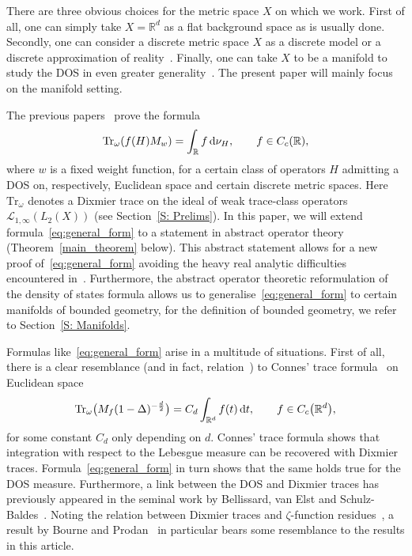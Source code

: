 \documentclass[pdftex]{sigma}
\numberwithin{equation}{section}
\begin{document}
There are three obvious choices for the metric space $X$ on which we work. First of all, one can simply take $X = \mathbb{R}^d$ as a flat background space as is usually done. Secondly, one can consider a discrete metric space $X$ as a discrete model or a discrete approximation of reality~\cite{AizenmanWarzel2015, AlexanderOrbach1982, BourgainKlein2013, CarmonaLacroix1990, ChayesChayes1986, Hof1993, KirschMuller2006, PasturFigotin1992, Veselic2005, Wegner1981}. Finally, one can take $X$ to be a manifold to study the DOS in even greater generality~\cite{AdachiSunada1993, LenzPeyerimhoff2008, LenzPeyerimhoff2004, PeyerimhoffVeselic2002, Veselic2008}. The present paper will mainly focus on the manifold setting.

The previous papers~\cite{AHMSZ,AMSZ} prove the formula
\begin{equation}
\label{eq:general_form}
\mathrm{Tr}_\omega(f(H) M_w) = \int_{\mathbb{R}} f \, {\rm d}\nu_H, \qquad f\in C_c(\mathbb{R}),
\end{equation}
where $w$ is a fixed weight function, for a certain class of operators $H$ admitting a DOS on, respectively, Euclidean space and certain discrete metric spaces. Here $\mathrm{Tr}_\omega$ denotes a Dixmier trace on the ideal of weak trace-class operators $\mathcal{L}_{1,\infty} (L_2(X))$ (see Section~\ref{S: Prelims}). In this paper, we will extend formula~\eqref{eq:general_form} to a statement in abstract operator theory (Theorem~\ref{main_theorem} below). This abstract statement allows for a new proof of~\eqref{eq:general_form} avoiding the heavy real analytic difficulties encountered in~\cite{AHMSZ, AMSZ}. Furthermore, the abstract operator theoretic reformulation of the density of states formula allows us to generalise~\eqref{eq:general_form}
to certain manifolds of bounded geometry, for the definition of bounded geometry, we refer to Section~\ref{S: Manifolds}.

Formulas like~\eqref{eq:general_form} arise in a multitude of situations. First of all, there is a clear resemblance (and in fact, relation~\cite{AMSZ}) to Connes' trace formula~\cite{Connes1988, LMSZVol2} on Euclidean space
\[
\mathrm{Tr}_\omega\big(M_f (1-\Delta)^{-\frac{d}{2}}\big) = C_d \int_{\mathbb{R}^d} f(t) \, {\rm d}t, \qquad f \in C_c\big(\mathbb{R}^d\big),
\]
for some constant $C_d$ only depending on $d$. Connes' trace formula shows that integration with respect to the Lebesgue measure can be recovered with Dixmier traces. Formula~\eqref{eq:general_form} in turn shows that the same holds true for the DOS measure. Furthermore, a link between the DOS and Dixmier traces has previously appeared in the seminal work by Bellissard, van Elst and Schulz-Baldes~\cite{BellissardVanElst1994}. Noting the relation between Dixmier traces and $\zeta$-function residues~\cite{LSZVol1}, a result by Bourne and Prodan~\cite[Lemma~6.1]{BourneProdan2018} in particular bears some resemblance to the results in this article.
\end{document}
